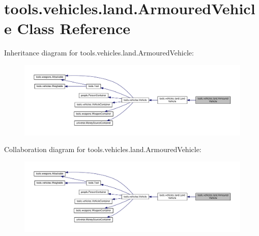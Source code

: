 \hypertarget{classtools_1_1vehicles_1_1land_1_1_armoured_vehicle}{}\section{tools.\+vehicles.\+land.\+Armoured\+Vehicle Class Reference}
\label{classtools_1_1vehicles_1_1land_1_1_armoured_vehicle}


Inheritance diagram for tools.\+vehicles.\+land.\+Armoured\+Vehicle\+:
\nopagebreak
\begin{figure}[H]
\begin{center}
\leavevmode
\includegraphics[width=350pt]{classtools_1_1vehicles_1_1land_1_1_armoured_vehicle__inherit__graph}
\end{center}
\end{figure}


Collaboration diagram for tools.\+vehicles.\+land.\+Armoured\+Vehicle\+:
\nopagebreak
\begin{figure}[H]
\begin{center}
\leavevmode
\includegraphics[width=350pt]{classtools_1_1vehicles_1_1land_1_1_armoured_vehicle__coll__graph}
\end{center}
\end{figure}
